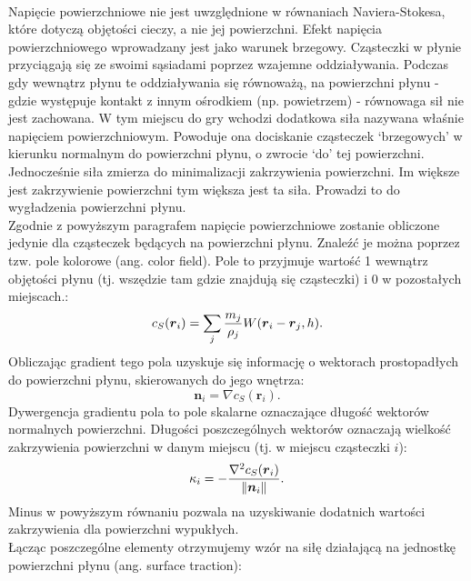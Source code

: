 \paragraph{}
Napięcie powierzchniowe nie jest uwzględnione w równaniach Naviera-Stokesa, które dotyczą objętości cieczy, a nie jej powierzchni. Efekt napięcia powierzchniowego wprowadzany jest jako warunek brzegowy. Cząsteczki w płynie przyciągają się ze swoimi sąsiadami poprzez wzajemne oddziaływania. Podczas gdy wewnątrz płynu te oddziaływania się równoważą, na powierzchni płynu - gdzie występuje kontakt z innym ośrodkiem (np. powietrzem) - równowaga sił nie jest zachowana. W tym miejscu do gry wchodzi dodatkowa siła nazywana właśnie napięciem powierzchniowym. Powoduje ona dociskanie cząsteczek `brzegowych' w kierunku normalnym do powierzchni płynu, o zwrocie `do' tej powierzchni. Jednocześnie siła zmierza do minimalizacji zakrzywienia powierzchni. Im większe jest zakrzywienie powierzchni tym większa jest ta siła. Prowadzi to do wygładzenia powierzchni płynu.\\
Zgodnie z powyższym paragrafem napięcie powierzchniowe zostanie obliczone jedynie dla cząsteczek będących na powierzchni płynu. Znaleźć je można poprzez tzw. pole kolorowe (ang. color field). Pole to przyjmuje wartość 1 wewnątrz objętości płynu (tj. wszędzie tam gdzie znajdują się cząsteczki) i 0 w pozostałych miejscach.:
\begin{equation}
{c}_S(\boldsymbol{r}_i) = \sum\limits_{j} {m_j \over \rho_j} W(\boldsymbol{r}_i-\boldsymbol{r}_j, h).
\label{eqn:color_field}
\end{equation}
Obliczając gradient tego pola uzyskuje się informację o wektorach prostopadłych do powierzchni płynu, skierowanych do jego wnętrza:
\begin{equation}
\boldsymbol{n}_i = \nabla{c}_S(\boldsymbol{r}_i).
\label{eqn:color_field_grad}
\end{equation}
Dywergencja gradientu pola to pole skalarne oznaczające długość wektorów normalnych powierzchni. Długości poszczególnych wektorów oznaczają wielkość zakrzywienia powierzchni w danym miejscu (tj. w miejscu cząsteczki $i$):
\begin{equation}
\kappa_i = -{\nabla^2{c}_S(\boldsymbol{r}_i) \over \|\boldsymbol{n}_i\|}.
\label{eqn:color_field_div}
\end{equation}
Minus w powyższym równaniu pozwala na uzyskiwanie dodatnich wartości zakrzywienia dla powierzchni wypukłych.\\
Łącząc poszczególne elementy otrzymujemy wzór na siłę działającą na jednostkę powierzchni płynu (ang. surface traction):
